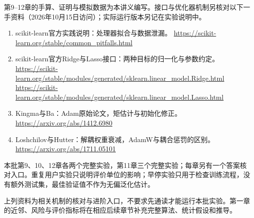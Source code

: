 \documentclass[UTF8,fontset=none,zihao=-4,a4paper]{ctexart}
\numberwithin{equation}{section}
\numberwithin{figure}{section}
\begin{document}
第9--12章的手算、证明与模拟数据为本讲义编写。接口与优化器机制另核对以下一手资料（2026年10月15日访问）；实际运行版本另记在实验说明中。
\begin{enumerate}
\item scikit-learn官方实践说明：处理器拟合与数据泄漏。\newline
\url{https://scikit-learn.org/stable/common_pitfalls.html}
\item scikit-learn官方Ridge与Lasso接口：两种目标的归一化与参数约定。\newline
\url{https://scikit-learn.org/stable/modules/generated/sklearn.linear_model.Ridge.html}\newline
\url{https://scikit-learn.org/stable/modules/generated/sklearn.linear_model.Lasso.html}
\item Kingma与Ba：Adam原始论文，矩估计与初始化修正。\newline
\url{https://arxiv.org/abs/1412.6980}
\item Loshchilov与Hutter：解耦权重衰减，AdamW与耦合惩罚的区别。\newline
\url{https://arxiv.org/abs/1711.05101}
\end{enumerate}
本批第9、10、12章各两个完整实验，第11章三个完整实验；每章另有一个答案核对入口。重复用户实验只说明评价单位的影响；早停实验只用于检查训练流程，没有额外测试集，最佳验证值不作为无偏泛化估计。

上列资料为相关机制的核对与进阶入口，不要求先通读才能运行本批实验。第一章的近邻、风险与评价指标将在相应后续章节补充完整算法、统计假设和推导。
\end{document}
